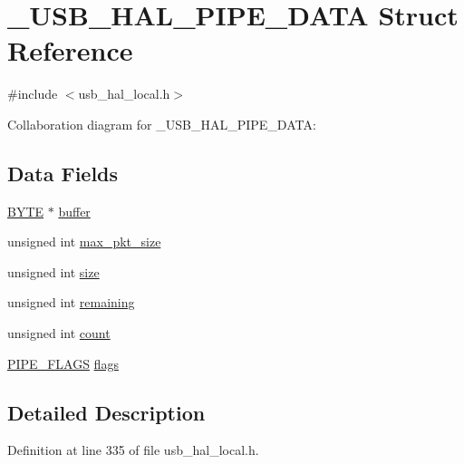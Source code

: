 \hypertarget{struct___u_s_b___h_a_l___p_i_p_e___d_a_t_a}{}\section{\+\_\+\+U\+S\+B\+\_\+\+H\+A\+L\+\_\+\+P\+I\+P\+E\+\_\+\+D\+A\+T\+A Struct Reference}
\label{struct___u_s_b___h_a_l___p_i_p_e___d_a_t_a}


{\ttfamily \#include $<$usb\+\_\+hal\+\_\+local.\+h$>$}



Collaboration diagram for \+\_\+\+U\+S\+B\+\_\+\+H\+A\+L\+\_\+\+P\+I\+P\+E\+\_\+\+D\+A\+T\+A\+:
\subsection*{Data Fields}
\begin{DoxyCompactItemize}
\item 
\hyperlink{_generic_type_defs_8h_a4ae1dab0fb4b072a66584546209e7d58}{B\+Y\+T\+E} $\ast$ \hyperlink{struct___u_s_b___h_a_l___p_i_p_e___d_a_t_a_a4ec488d25cd057a45ada6fd7c83de21b}{buffer}
\item 
unsigned int \hyperlink{struct___u_s_b___h_a_l___p_i_p_e___d_a_t_a_a00693e7e185ad131c5533e696338dd5a}{max\+\_\+pkt\+\_\+size}
\item 
unsigned int \hyperlink{struct___u_s_b___h_a_l___p_i_p_e___d_a_t_a_aac913b3a1f6ef005d66bf7a84428773e}{size}
\item 
unsigned int \hyperlink{struct___u_s_b___h_a_l___p_i_p_e___d_a_t_a_a3e03224b4745640802f8aae489382434}{remaining}
\item 
unsigned int \hyperlink{struct___u_s_b___h_a_l___p_i_p_e___d_a_t_a_a16ff2d8e15ade4948398b0aeb80124a8}{count}
\item 
\hyperlink{union_p_i_p_e___f_l_a_g_s}{P\+I\+P\+E\+\_\+\+F\+L\+A\+G\+S} \hyperlink{struct___u_s_b___h_a_l___p_i_p_e___d_a_t_a_a8ff67b6234d286477c289cf683600530}{flags}
\end{DoxyCompactItemize}


\subsection{Detailed Description}


Definition at line 335 of file usb\+\_\+hal\+\_\+local.\+h.



